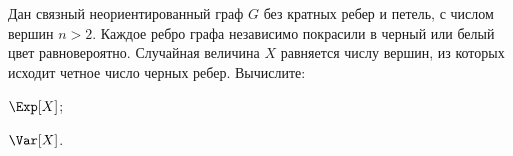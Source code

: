 Дан связный неориентированный граф $G$ без кратных ребер и петель, с числом вершин $n > 2$. Каждое ребро
графа независимо покрасили в черный или белый цвет равновероятно. Случайная величина $X$ равняется числу
вершин, из которых исходит четное число черных ребер. Вычислите:
\begin{enumcyr}
    \item $\Exp[X]$;
    \item $\Var[X]$.
\end{enumcyr}
